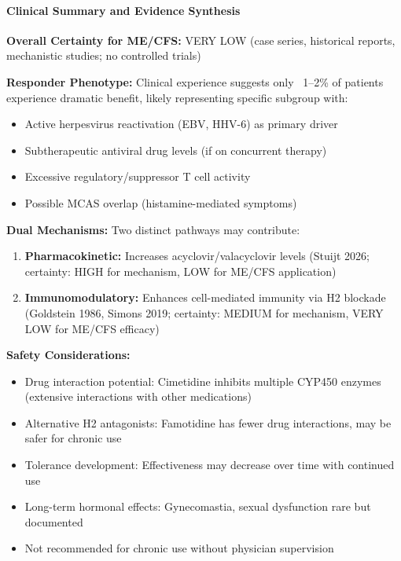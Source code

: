 \paragraph{Clinical Summary and Evidence Synthesis}

\textbf{Overall Certainty for ME/CFS:} VERY LOW (case series, historical reports, mechanistic studies; no controlled trials)

\textbf{Responder Phenotype:} Clinical experience suggests only ~1--2\% of patients experience dramatic benefit, likely representing specific subgroup with:
\begin{itemize}
    \item Active herpesvirus reactivation (EBV, HHV-6) as primary driver
    \item Subtherapeutic antiviral drug levels (if on concurrent therapy)
    \item Excessive regulatory/suppressor T cell activity
    \item Possible MCAS overlap (histamine-mediated symptoms)
\end{itemize}

\textbf{Dual Mechanisms:} Two distinct pathways may contribute:
\begin{enumerate}
    \item \textbf{Pharmacokinetic:} Increases acyclovir/valacyclovir levels (Stuijt 2026; certainty: HIGH for mechanism, LOW for ME/CFS application)
    \item \textbf{Immunomodulatory:} Enhances cell-mediated immunity via H2 blockade (Goldstein 1986, Simons 2019; certainty: MEDIUM for mechanism, VERY LOW for ME/CFS efficacy)
\end{enumerate}

\textbf{Safety Considerations:}
\begin{itemize}
    \item Drug interaction potential: Cimetidine inhibits multiple CYP450 enzymes (extensive interactions with other medications)
    \item Alternative H2 antagonists: Famotidine has fewer drug interactions, may be safer for chronic use
    \item Tolerance development: Effectiveness may decrease over time with continued use
    \item Long-term hormonal effects: Gynecomastia, sexual dysfunction rare but documented
    \item Not recommended for chronic use without physician supervision
\end{itemize}

